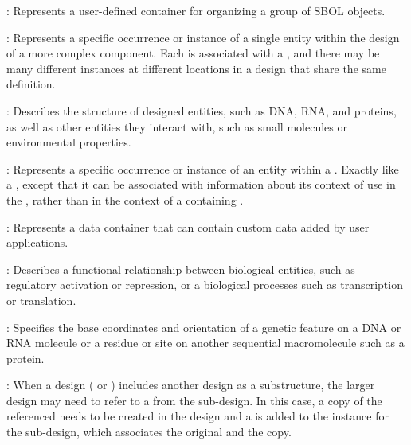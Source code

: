 \begin{description}

\item \emph{}:
Represents a user-defined container for organizing a group of SBOL objects.

\item \emph{}:
Represents a specific occurrence or instance of a single entity within the design of a more complex component.
Each  is associated with a , and there may be many different instances at different locations in a design that share the same definition.

\item \emph{}: Describes the structure of designed entities, such as DNA, RNA, and proteins, as well as other entities they interact with, such as small molecules or environmental properties.

\item \emph{}:
Represents a specific occurrence or instance of an entity within a .
Exactly like a , except that it can be associated with information about its context of use in the , rather than in the context of a containing .

\item \emph{}:
Represents a data container that can contain custom data added by user applications.

\item \emph{}:
Describes a functional relationship between biological entities, such as regulatory activation or repression, or a biological processes such as transcription or translation.

\item \emph{}:
Specifies the base coordinates and orientation of a genetic feature on a DNA or RNA molecule or a residue or site on another sequential macromolecule such as a protein.

\item \emph{}:
When a design ( or ) includes another design as a substructure, the larger design may need to refer to a  from the sub-design.
In this case, a copy of the referenced  needs to be created in the design and a  is added to the instance for the sub-design, which associates the original and the copy.


\end{description}
